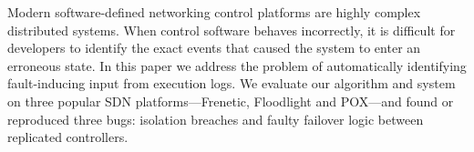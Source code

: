 Modern software-defined networking control platforms are highly complex distributed
systems. When control software behaves incorrectly, it is difficult
for developers to identify the exact events that caused the system to enter
an erroneous state. In this paper we address the problem of automatically
identifying fault-inducing input from execution logs. We evaluate our
algorithm and system on three popular SDN platforms---Frenetic, Floodlight and POX---and
found or reproduced three bugs:
isolation breaches and faulty failover logic between replicated controllers.

